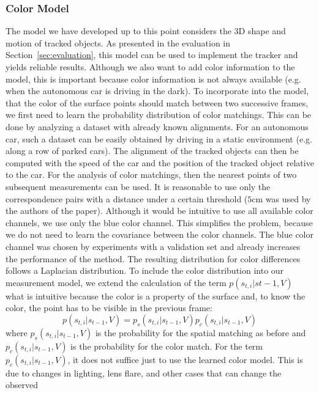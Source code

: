 \documentclass[twoside,a4paper,article]{combine}
\begin{document}
\subsubsection{Color Model}
The model we have developed up to this point considers the 3D shape
and motion of tracked objects. As presented in the evaluation in
Section~\ref{sec:evaluation}, this model can be used to implement the
tracker and yields reliable results. Although we also want to add
color information to the model, this is important because color
information is not always available (e.g. when the autonomous car is
driving in the dark). To incorporate into the model, that the color of the
surface points should match between two successive frames,
we first need to learn the probability distribution of color
matchings. This can be done by analyzing a dataset with already known
alignments. For an autonomous car, such a dataset can be easily
obtained by driving in a static environment (e.g. along a row of
parked cars). The alignment of the tracked objects can then be
computed with the speed of the car and the position of the tracked
object relative to the car. For the analysis of color matchings, then
the nearest points of two subsequent measurements can be used. It is
reasonable to use only the correspondence pairs with a distance under
a certain threshold ($5\mathrm{cm}$ was used by the authors of the
paper). Although it would be intuitive to use all available color
channels, we use only the blue color channel. This simplifies the
problem, because we do not need to learn the covariance between the
color channels. The blue color channel was chosen by experiments with a
validation set and already increases the performance of the
method. The resulting distribution for color differences
follows a Laplacian distribution.
To include the color distribution into our measurement model, we
extend the calculation of the term $p(s_{t,i}|s{t-1},V)$ what is
intuitive because the color is a property of the surface and, to know
the color, the point has to be visible in the previous frame:
\begin{equation}
  p(s_{t,i}|s_{t-1},V) = p_s(s_{t,i}|s_{t-1},V) p_c(s_{t,i}|s_{t-1},V)
\end{equation}
where $p_s(s_{t,i}|s_{t-1},V)$ is the probability for the spatial
matching as before and $p_c(s_{t,i}|s_{t-1},V)$ is the probability for
the color match. For the term $p_c(s_{t,i}|s_{t-1},V)$, it does not
suffice just to use the learned color model. This is due to changes in
lighting, lens flare, and other cases that can change the observed
\end{document}
